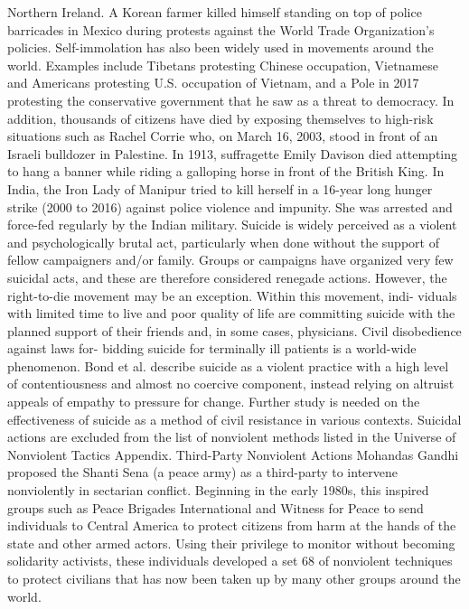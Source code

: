 \documentclass[twoside,a4paper,12pt,fleqn,openany]{extbook}
\begin{document}
Northern Ireland. A Korean farmer killed himself standing on top of police barricades in Mexico
during protests against the World Trade Organization’s policies. Self-immolation has also been
widely used in movements around the world. Examples include Tibetans protesting Chinese
occupation, Vietnamese and Americans protesting U.S. occupation of Vietnam, and a Pole in
2017 protesting the conservative government that he saw as a threat to democracy.
In addition, thousands of citizens have died by exposing themselves to high-risk situations
such as Rachel Corrie who, on March 16, 2003, stood in front of an Israeli bulldozer in Palestine.
In 1913, suffragette Emily Davison died attempting to hang a banner while riding a galloping
horse in front of the British King. In India, the Iron Lady of Manipur tried to kill herself in a
16-year long hunger strike (2000 to 2016) against police violence and impunity. She was
arrested and force-fed regularly by the Indian military.
Suicide is widely perceived as a violent and psychologically brutal act, particularly when
done without the support of fellow campaigners and/or family. Groups or campaigns have
organized very few suicidal acts, and these are therefore considered renegade actions.
However, the right-to-die movement may be an exception. Within this movement, indi-
viduals with limited time to live and poor quality of life are committing suicide with the planned
support of their friends and, in some cases, physicians. Civil disobedience against laws for-
bidding suicide for terminally ill patients is a world-wide phenomenon. Bond et al. describe
suicide as a violent practice with a high level of contentiousness and almost no coercive
component, instead relying on altruist appeals of empathy to pressure for change. Further
study is needed on the effectiveness of suicide as a method of civil resistance in various
contexts. Suicidal actions are excluded from the list of nonviolent methods listed in the
Universe of Nonviolent Tactics Appendix.
Third-Party Nonviolent Actions
Mohandas Gandhi proposed the Shanti Sena (a peace army) as a third-party to intervene
nonviolently in sectarian conflict. Beginning in the early 1980s, this inspired groups such as
Peace Brigades International and Witness for Peace to send individuals to Central America
to protect citizens from harm at the hands of the state and other armed actors. Using their
privilege to monitor without becoming solidarity activists, these individuals developed a set
68
of nonviolent techniques to protect civilians that has now been taken up by many other
groups around the world.
\end{document}
